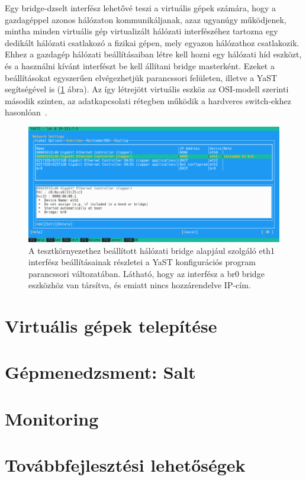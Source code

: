 Egy bridge-dzselt interfész lehetővé teszi a virtuális gépek számára, hogy a gazdagéppel azonos hálózaton kommunikáljanak, azaz ugyanúgy működjenek, mintha minden virtuális gép virtualizált hálózati interfészéhez tartozna egy dedikált hálózati csatlakozó a fizikai gépen, mely egyazon hálózathoz csatlakozik. Ehhez a gazdagép hálózati beállításaiban létre kell hozni egy hálózati híd eszközt, és a használni kívánt interfészt be kell állítani bridge masterként.
Ezeket a beállításokat egyszerűen elvégezhetjük parancssori felületen, illetve a YaST segítségével is (\ref{fig:yast-net-bridge} ábra). Az így létrejött virtuális eszköz az OSI-modell szerinti második szinten, az adatkapcsolati rétegben működik a hardveres switch-ekhez hasonlóan~\cite{SUSENetBridge}.

\begin{figure}[ht]
	\centering
	\includegraphics[width=15cm]{figures/yast-br0.png}
	\caption{A tesztkörnyezethez beállított hálózati bridge alapjául szolgáló eth1 interfész beállításainak részletei a YaST konfigurációs program parancssori változatában. Látható, hogy az interfész a br0 bridge eszközhöz van társítva, és emiatt nincs hozzárendelve IP-cím.}
	\label{fig:yast-net-bridge}
\end{figure}

\section{Virtuális gépek telepítése}

\section{Gépmenedzsment: Salt}


\section{Monitoring}

\section{Továbbfejlesztési lehetőségek}